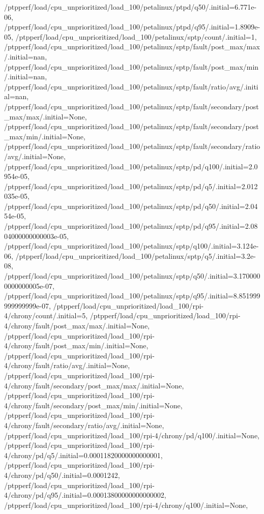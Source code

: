 {    /ptpperf/load/cpu_unprioritized/load_100/petalinux/ptpd/q50/.initial=6.771e-06,
    /ptpperf/load/cpu_unprioritized/load_100/petalinux/ptpd/q95/.initial=1.8909e-05,
    /ptpperf/load/cpu_unprioritized/load_100/petalinux/sptp/count/.initial=1,
    /ptpperf/load/cpu_unprioritized/load_100/petalinux/sptp/fault/post_max/max/.initial=nan,
    /ptpperf/load/cpu_unprioritized/load_100/petalinux/sptp/fault/post_max/min/.initial=nan,
    /ptpperf/load/cpu_unprioritized/load_100/petalinux/sptp/fault/ratio/avg/.initial=nan,
    /ptpperf/load/cpu_unprioritized/load_100/petalinux/sptp/fault/secondary/post_max/max/.initial=None,
    /ptpperf/load/cpu_unprioritized/load_100/petalinux/sptp/fault/secondary/post_max/min/.initial=None,
    /ptpperf/load/cpu_unprioritized/load_100/petalinux/sptp/fault/secondary/ratio/avg/.initial=None,
    /ptpperf/load/cpu_unprioritized/load_100/petalinux/sptp/pd/q100/.initial=2.0954e-05,
    /ptpperf/load/cpu_unprioritized/load_100/petalinux/sptp/pd/q5/.initial=2.012035e-05,
    /ptpperf/load/cpu_unprioritized/load_100/petalinux/sptp/pd/q50/.initial=2.0454e-05,
    /ptpperf/load/cpu_unprioritized/load_100/petalinux/sptp/pd/q95/.initial=2.0804000000000003e-05,
    /ptpperf/load/cpu_unprioritized/load_100/petalinux/sptp/q100/.initial=3.124e-06,
    /ptpperf/load/cpu_unprioritized/load_100/petalinux/sptp/q5/.initial=3.2e-08,
    /ptpperf/load/cpu_unprioritized/load_100/petalinux/sptp/q50/.initial=3.1700000000000005e-07,
    /ptpperf/load/cpu_unprioritized/load_100/petalinux/sptp/q95/.initial=8.851999999999999e-07,
    /ptpperf/load/cpu_unprioritized/load_100/rpi-4/chrony/count/.initial=5,
    /ptpperf/load/cpu_unprioritized/load_100/rpi-4/chrony/fault/post_max/max/.initial=None,
    /ptpperf/load/cpu_unprioritized/load_100/rpi-4/chrony/fault/post_max/min/.initial=None,
    /ptpperf/load/cpu_unprioritized/load_100/rpi-4/chrony/fault/ratio/avg/.initial=None,
    /ptpperf/load/cpu_unprioritized/load_100/rpi-4/chrony/fault/secondary/post_max/max/.initial=None,
    /ptpperf/load/cpu_unprioritized/load_100/rpi-4/chrony/fault/secondary/post_max/min/.initial=None,
    /ptpperf/load/cpu_unprioritized/load_100/rpi-4/chrony/fault/secondary/ratio/avg/.initial=None,
    /ptpperf/load/cpu_unprioritized/load_100/rpi-4/chrony/pd/q100/.initial=None,
    /ptpperf/load/cpu_unprioritized/load_100/rpi-4/chrony/pd/q5/.initial=0.00011820000000000001,
    /ptpperf/load/cpu_unprioritized/load_100/rpi-4/chrony/pd/q50/.initial=0.0001242,
    /ptpperf/load/cpu_unprioritized/load_100/rpi-4/chrony/pd/q95/.initial=0.00013800000000000002,
    /ptpperf/load/cpu_unprioritized/load_100/rpi-4/chrony/q100/.initial=None,
}
